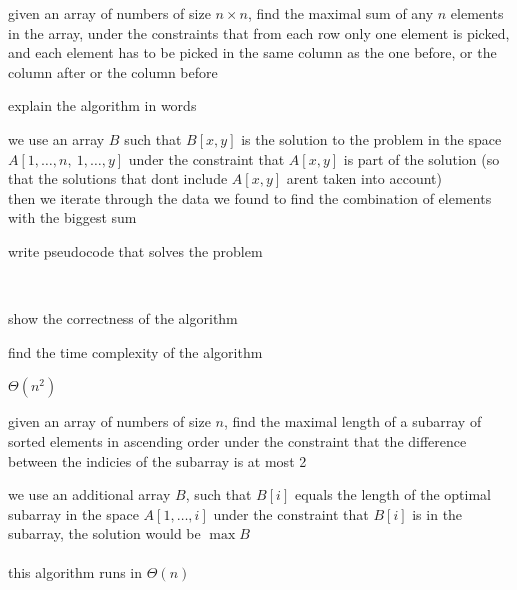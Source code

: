 \documentclass[a4paper,12pt]{article}
\begin{document}
\begin{question}
given an array of numbers of size \(n \times n\), find the maximal sum of any \(n\) elements in the array, under the constraints that from each row only one element is picked, and each element has to be picked in the same column as the one before, or the column after or the column before\\
\begin{subquestion}
explain the algorithm in words\\
\begin{answer}
we use an array \(B\) such that \(B[x,y]\) is the solution to the problem in the space \(A[1,\dots,n,\ 1,\dots,y]\) under the constraint that \(A[x,y]\) is part of the solution (so that the solutions that dont include \(A[x,y]\) arent taken into account)\\
then we iterate through the data we found to find the combination of elements with the biggest sum\\
\end{answer}
\end{subquestion}
\begin{subquestion}
write pseudocode that solves the problem\\
\begin{answer}
\\
\end{answer}
\end{subquestion}
\begin{subquestion}
show the correctness of the algorithm\\
\end{subquestion}
\begin{subquestion}
find the time complexity of the algorithm\\
\begin{answer}
\(\Theta(n^2)\)\\
\end{answer}
\end{subquestion}
\end{question}
\begin{question}
given an array of numbers of size \(n\), find the maximal length of a subarray of sorted elements in ascending order under the constraint that the difference between the indicies of the subarray is at most 2\\
\begin{answer}
we use an additional array \(B\), such that \(B[i]\) equals the length of the optimal subarray in the space \(A[1,\dots,i]\) under the constraint that \(B[i]\) is in the subarray, the solution would be \(\max B\)\\
\\

this algorithm runs in \(\Theta(n)\)\\
\end{answer}
\end{question}
\end{document}
